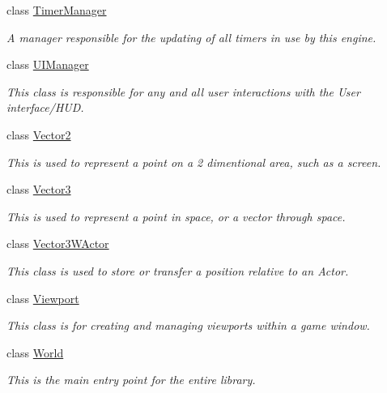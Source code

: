 \begin{DoxyCompactItemize}
class \hyperlink{classphys_1_1TimerManager}{TimerManager}
\begin{DoxyCompactList}\small\item\em A manager responsible for the updating of all timers in use by this engine. \item\end{DoxyCompactList}\item 
class \hyperlink{classphys_1_1UIManager}{UIManager}
\begin{DoxyCompactList}\small\item\em This class is responsible for any and all user interactions with the User interface/HUD. \item\end{DoxyCompactList}\item 
class \hyperlink{classphys_1_1Vector2}{Vector2}
\begin{DoxyCompactList}\small\item\em This is used to represent a point on a 2 dimentional area, such as a screen. \item\end{DoxyCompactList}\item 
class \hyperlink{classphys_1_1Vector3}{Vector3}
\begin{DoxyCompactList}\small\item\em This is used to represent a point in space, or a vector through space. \item\end{DoxyCompactList}\item 
class \hyperlink{classphys_1_1Vector3WActor}{Vector3WActor}
\begin{DoxyCompactList}\small\item\em This class is used to store or transfer a position relative to an Actor. \item\end{DoxyCompactList}\item 
class \hyperlink{classphys_1_1Viewport}{Viewport}
\begin{DoxyCompactList}\small\item\em This class is for creating and managing viewports within a game window. \item\end{DoxyCompactList}\item 
class \hyperlink{classphys_1_1World}{World}
\begin{DoxyCompactList}\small\item\em This is the main entry point for the entire library. \item\end{DoxyCompactList}\item 

\end{DoxyCompactItemize}
